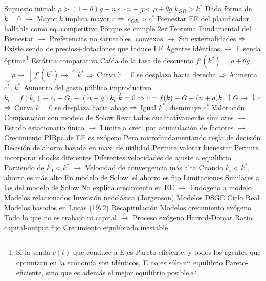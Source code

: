 \documentclass{nuevotema}
\begin{document}
\begin{esquemal}
				\4 Supuesto inicial: $\rho > (1-\theta) g + n \iff n + g < \rho + \theta g$
				\4[$\then$] $k_{GR} > k^*$
				\4[] Dada forma de $\dot{k} = 0$
				\4[] $\to$ Mayor $k$ implica mayor $c$
				\4[] $\then$ $c_{GR} > c^*$
			\3 Bienestar
				\4 EE del planificador hallable como eq. competitivo
				\4[] Porque se cumple 2er Teorema Fundamental del Bienestar
				\4[] $\to$ Preferencias no saturables, convexas
				\4[] $\to$ Sin externalidades
				\4[] $\then$ Existe senda de precios+dotaciones que induce EE
				\4 Agentes idénticos $\to$ E senda óptima\footnote{Si la senda $c(t)$ que conduce a E es Pareto-eficiente, y todos los agentes que optimizan en la economía son idénticos, E no es sólo un equilibrio Pareto-eficiente, sino que es además el mejor equilibrio posible.}
			\3 Estática comparativa
				\4 Caída de la tasa de descuento
				\4[] $f'(k^*) = \rho + \theta g$
				\4[] $\downarrow \rho \to \downarrow f'(k^*) \to \uparrow k^*$
				\4[] $\then$ Curva $\dot{c} = 0$ se desplaza hacia derecha
				\4[] $\then$ Aumenta $c^*$, $k^*$
				\4[] 
				\4 Aumento del gasto público improductivo
				\4[] $\dot{k}_t =  f(k_t) - c_t - G_t - (n+g)k_t$
				\4[] $\dot{k} = 0 \Rightarrow c = f(k) - G - (n+g)k$
				\4[] $\uparrow G \to \downarrow c$
				\4[] $\then$ Curva $\dot{k} = 0$ se desplaza hacia abajo
				\4[] $\then$ Igual $k^*$, disminuye $c^*$
				\4[] 
		\2 Valoración
			\3 Comparación con modelo de Solow
				\4 Resultados cualitativamente similares
				\4[] $\to$ Estado estacionario único
				\4[] $\to$ Límite a crec. por acumulación de factores
				\4[] $\to$ Crecimiento PIBpc de EE es exógeno
				\4 Pero microfundamentando regla de decisión
				\4[] Decisión de ahorro basada en max. de utilidad
				\4 Permite valorar bienestar
				\4 Permite incorporar shocks diferentes
				\4 Diferentes velocidades de ajuste a equilibrio
				\4[] Partiendo de $k_0 < k^*$
				\4[] $\to$ Velocidad de convergencia más alta
				\4[] Cuando $k_t<k^*$, ahorro es más alto
				\4[] En modelo de Solow, el ahorro es fijo
			\3 Limitaciones
				\4 Similares a las del modelo de Solow
				\4 No explica crecimiento en EE
				\4[] $\to$ Endógeno a modelo
			\3 Modelos relacionados
				\4 Inversión neoclásica (Jorgenson)
				\4 Modelos DSGE
				\4[] Ciclo Real
				\4[] Modelos basados en Lucas (1972)
	\1[] 
		\2 Recapitulación
			\3 Modelos crecimiento exógeno
				\4 Todo lo que no es trabajo ni capital
				\4[] $\to$ Proceso exógeno
			\3 Harrod-Domar
				\4 Ratio capital-output fijo
				\4 Crecimiento equilibrado inestable

\end{esquemal}
\end{document}
